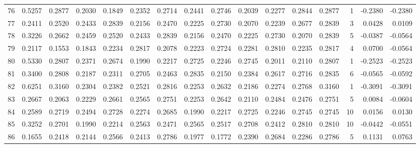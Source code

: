 \begin{tabular}{lrrrrrrrrrrrrrrr}
76  &      0.5257 &  0.2877 &  0.2030 &  0.1849 &  0.2352 &  0.2714 &  0.2441 &  0.2746 &  0.2039 &  0.2277 &   0.2844 &     0.2877 &      1 &                   -0.2380 &                    -0.2380 \\
77  &      0.2411 &  0.2520 &  0.2433 &  0.2839 &  0.2156 &  0.2470 &  0.2225 &  0.2730 &  0.2070 &  0.2239 &   0.2677 &     0.2839 &      3 &                    0.0428 &                     0.0109 \\
78  &      0.3226 &  0.2662 &  0.2459 &  0.2520 &  0.2433 &  0.2839 &  0.2156 &  0.2470 &  0.2225 &  0.2730 &   0.2070 &     0.2839 &      5 &                   -0.0387 &                    -0.0564 \\
79  &      0.2117 &  0.1553 &  0.1843 &  0.2234 &  0.2817 &  0.2078 &  0.2223 &  0.2724 &  0.2281 &  0.2810 &   0.2235 &     0.2817 &      4 &                    0.0700 &                    -0.0564 \\
80  &      0.5330 &  0.2807 &  0.2371 &  0.2674 &  0.1990 &  0.2217 &  0.2725 &  0.2246 &  0.2745 &  0.2011 &   0.2110 &     0.2807 &      1 &                   -0.2523 &                    -0.2523 \\
81  &      0.3400 &  0.2808 &  0.2187 &  0.2311 &  0.2705 &  0.2463 &  0.2835 &  0.2150 &  0.2384 &  0.2617 &   0.2716 &     0.2835 &      6 &                   -0.0565 &                    -0.0592 \\
82  &      0.6251 &  0.3160 &  0.2304 &  0.2382 &  0.2521 &  0.2816 &  0.2253 &  0.2632 &  0.2186 &  0.2274 &   0.2768 &     0.3160 &      1 &                   -0.3091 &                    -0.3091 \\
83  &      0.2667 &  0.2063 &  0.2229 &  0.2661 &  0.2565 &  0.2751 &  0.2253 &  0.2642 &  0.2110 &  0.2484 &   0.2476 &     0.2751 &      5 &                    0.0084 &                    -0.0604 \\
84  &      0.2589 &  0.2719 &  0.2494 &  0.2728 &  0.2274 &  0.2685 &  0.1990 &  0.2217 &  0.2725 &  0.2246 &   0.2745 &     0.2745 &     10 &                    0.0156 &                     0.0130 \\
85  &      0.3252 &  0.2701 &  0.1990 &  0.2214 &  0.2563 &  0.2471 &  0.2565 &  0.2517 &  0.2708 &  0.2412 &   0.2810 &     0.2810 &     10 &                   -0.0442 &                    -0.0551 \\
86  &      0.1655 &  0.2418 &  0.2144 &  0.2566 &  0.2413 &  0.2786 &  0.1977 &  0.1772 &  0.2390 &  0.2684 &   0.2286 &     0.2786 &      5 &                    0.1131 &                     0.0763 \\

\end{tabular}
